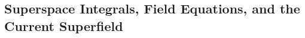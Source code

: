 
\subsection{Superspace Integrals, Field Equations, and the Current Superfield}

\providecommand{\SuperD}{\mathcal{D}}

